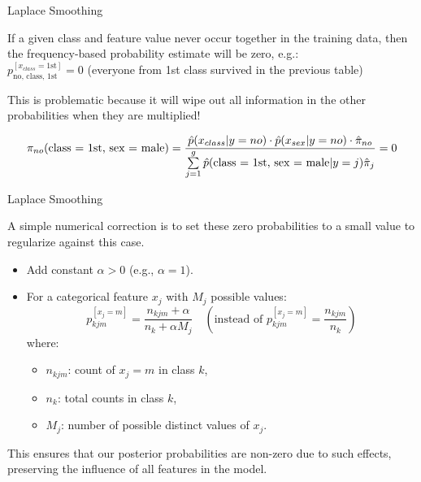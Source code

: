 \documentclass[11pt,compress,t,notes=noshow, xcolor=table]{beamer}
\begin{document}
\begin{vbframe}{Laplace Smoothing}
\begin{small}
If a given class and feature value never occur together in the training data, then the frequency-based probability estimate will be zero, e.g.:\\
$p_{\text{no, class, 1st}}^{[x_{class} = \text{1st}]} = 0$ (everyone from 1st class survived in the previous table)

\lz


This is problematic because it will wipe out all information in the other probabilities when they are multiplied!

$$
\pi_{no} (\text{class = 1st, sex = male}) = \frac{\hat{p}(x_{class} | y = no) \cdot \hat{p}(x_{sex} | y = no)\cdot \pikh[no]}{\sumjg \hat{p}(\text{class = 1st, sex = male} | y = j)\pih_j} = 0
$$

\end{small}

\end{vbframe}


\begin{vbframe}{Laplace Smoothing}

A simple numerical correction is to set these zero probabilities to a small value to regularize against this case.

\lz
 
\begin{itemize}
\item Add constant $\alpha > 0$ (e.g., $\alpha = 1$).
\item For a categorical feature $x_j$ with $M_j$ possible values:
  $$
  p_{kjm}^{[x_j = m]} = \frac{n_{kjm} + \alpha}{n_{k} + \alpha M_j} \quad \left(\text{instead of }  p_{kjm}^{[x_j = m]} = \frac{n_{kjm}}{n_{k}} \right)
  $$
  where:
  \begin{itemize}
    \item $n_{kjm}$: count of $x_j = m$ in class $k$,
    \item $n_{k}$: total counts in class $k$,
    \item $M_j$: number of possible distinct values of $x_j$.
  \end{itemize}
\end{itemize}

\lz

This ensures that our posterior probabilities are non-zero due to such effects, preserving the influence of all features in the model.

\end{vbframe}
\end{document}
